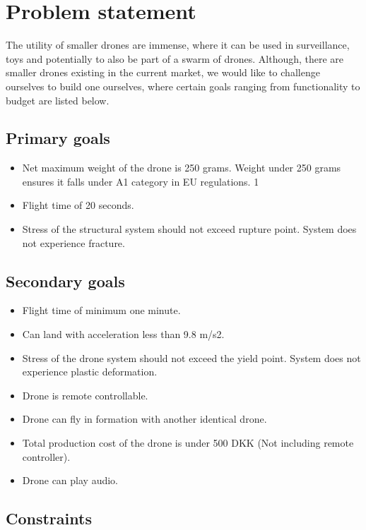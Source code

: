 \section{Problem statement}

The utility of smaller drones are immense, where it can be used in surveillance, toys and potentially to also be part of a swarm of drones. Although, there are smaller drones existing in the current market, we would like to challenge ourselves to build one ourselves, where certain goals ranging from functionality to budget are listed below.


\subsection{Primary goals }
\begin{itemize}
    \item
          Net maximum weight of the drone is 250 grams. Weight under 250 grams ensures it falls under A1 category in EU regulations. 1
    \item
          Flight time of 20 seconds.
    \item
          Stress of the structural system should not exceed rupture point. System does not experience fracture.
\end{itemize}


\subsection{Secondary goals}
\begin{itemize}
    \item
          Flight time of minimum one minute.
    \item
          Can land with acceleration less than 9.8 m/s2.
    \item
          Stress of the drone system should not exceed the yield point. System does not experience plastic deformation.
    \item
          Drone is remote controllable.
    \item
          Drone can fly in formation with another identical drone.
    \item
          Total production cost of the drone is under 500 DKK (Not including remote controller).
    \item
          Drone can play audio.
\end{itemize}



\subsection{Constraints}


